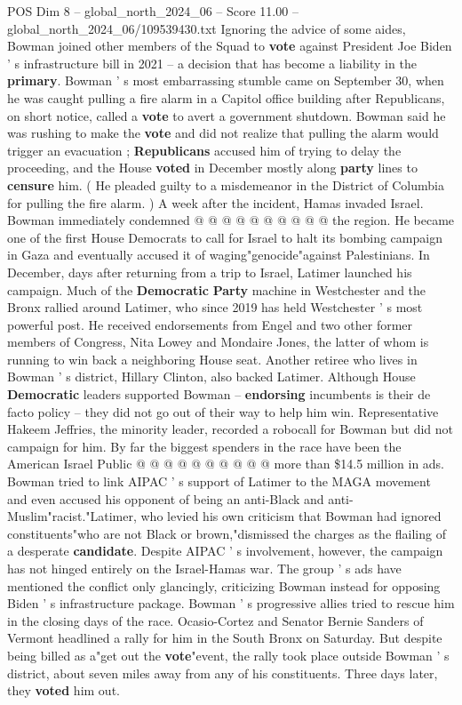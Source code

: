 \begin{textsample}{POS Dim 8 – global\_north\_2024\_06 – Score 11.00 – global\_north\_2024\_06/109539430.txt}
Ignoring the advice of some aides, Bowman joined other members of the Squad to \textbf{vote} against President Joe Biden ' s infrastructure bill in 2021 -- a decision that has become a liability in the \textbf{primary}.
Bowman ' s most embarrassing stumble came on September 30, when he was caught pulling a fire alarm in a Capitol office building after Republicans, on short notice, called a \textbf{vote} to avert a government shutdown.
Bowman said he was rushing to make the \textbf{vote} and did not realize that pulling the alarm would trigger an evacuation ; \textbf{Republicans} accused him of trying to delay the proceeding, and the House \textbf{voted} in December mostly along \textbf{party} lines to \textbf{censure} him. ( He pleaded guilty to a misdemeanor in the District of Columbia for pulling the fire alarm. ) A week after the incident, Hamas invaded Israel.
Bowman immediately condemned @ @ @ @ @ @ @ @ @ @ the region.
He became one of the first House Democrats to call for Israel to halt its bombing campaign in Gaza and eventually accused it of waging"genocide"against Palestinians.
In December, days after returning from a trip to Israel, Latimer launched his campaign.
Much of the \textbf{Democratic} \textbf{Party} machine in Westchester and the Bronx rallied around Latimer, who since 2019 has held Westchester ' s most powerful post.
He received endorsements from Engel and two other former members of Congress, Nita Lowey and Mondaire Jones, the latter of whom is running to win back a neighboring House seat.
Another retiree who lives in Bowman ' s district, Hillary Clinton, also backed Latimer.
Although House \textbf{Democratic} leaders supported Bowman -- \textbf{endorsing} incumbents is their de facto policy -- they did not go out of their way to help him win.
Representative Hakeem Jeffries, the minority leader, recorded a robocall for Bowman but did not campaign for him.
By far the biggest spenders in the race have been the American Israel Public @ @ @ @ @ @ @ @ @ @ more than \$14.5 million in ads.
Bowman tried to link AIPAC ' s support of Latimer to the MAGA movement and even accused his opponent of being an anti-Black and anti-Muslim"racist."Latimer, who levied his own criticism that Bowman had ignored constituents"who are not Black or brown,"dismissed the charges as the flailing of a desperate \textbf{candidate}.
Despite AIPAC ' s involvement, however, the campaign has not hinged entirely on the Israel-Hamas war.
The group ' s ads have mentioned the conflict only glancingly, criticizing Bowman instead for opposing Biden ' s infrastructure package.
Bowman ' s progressive allies tried to rescue him in the closing days of the race.
Ocasio-Cortez and Senator Bernie Sanders of Vermont headlined a rally for him in the South Bronx on Saturday.
But despite being billed as a"get out the \textbf{vote}"event, the rally took place outside Bowman ' s district, about seven miles away from any of his constituents.
Three days later, they \textbf{voted} him out.

\end{textsample}
